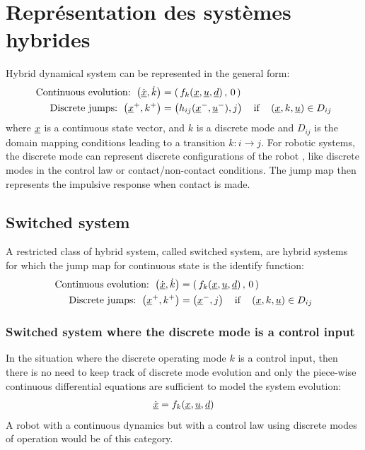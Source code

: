 \newpage
\section{Représentation des systèmes hybrides}

Hybrid dynamical system can be represented in the general form:
%
\begin{align}
\text{Continuous evolution: } \left(  \dot{\underline{x}} , \dot{k} \right) &=  \left( \, f_k( \underline{x} , \underline{u} , \underline{d} ) \, , \, 0 \, \right) \\
\text{Discrete jumps: } \left(  \underline{x}^+ , k^+ \right) &=  \left( h_{ij}( \underline{x}^- , \underline{u}^- ) , j \right) \quad\text{if}\quad \left(  \underline{x} , k , \underline{u} \right) \in D_{ij}  
\end{align}
%
where $\underline{x}$ is a continuous state vector, and $k$ is a discrete mode and $D_{ij}$ is the domain mapping conditions leading to a transition $k:i \rightarrow j$. For robotic systems, the discrete mode can represent discrete configurations of the robot , like discrete modes in the control law or contact/non-contact conditions. The jump map then represents the impulsive response when contact is made. 

\subsection{Switched system}

A restricted class of hybrid system, called switched system, are hybrid systems for which the jump map for continuous state is the identify function:
%
\begin{align}
\text{Continuous evolution: } \left(  \dot{\underline{x}} , \dot{k} \right) &=  \left( \, f_k( \underline{x} , \underline{u} , \underline{d} ) \, , \, 0 \, \right) \\
\text{Discrete jumps: } \left(  \underline{x}^+ , k^+ \right) &=  \left( \underline{x}^- , j \right) \quad\text{if}\quad \left(  \underline{x} , k , \underline{u} \right) \in D_{ij} 
\end{align}
%

\subsubsection{Switched system where the discrete mode is a control input}

In the situation where the discrete operating mode $k$ is a control input, then there is no need to keep track of discrete mode evolution and only the piece-wise continuous differential equations are sufficient to model the system evolution:
%
\begin{align}
\dot{\underline{x}} = f_k( \underline{x} , \underline{u} , \underline{d} ) 
\end{align}
%
A robot with a continuous dynamics but with a control law using discrete modes of operation would be of this category. 








